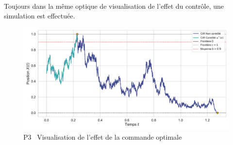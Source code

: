 \FloatBarrier Toujours dans la même optique de visualisation de l'effet du contrôle, une simulation est effectuée. 
\begin{figure}[htb]
    \centering
    \includegraphics[width=0.9\linewidth]{img/validation/P3/p3_control_simulation.pdf}
    \caption{P3 \textemdash~Visualisation de l'effet de la commande optimale}\label{fig:Simulation3}
\end{figure}
